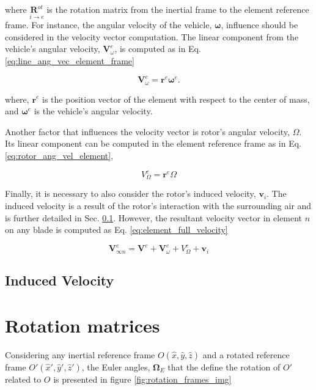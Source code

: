 \noindent where $\underset{i \to e}{\boldsymbol{R}^{ot}}$ is the rotation matrix from the inertial frame to the element reference frame. For instance, the angular velocity of the vehicle, $\boldsymbol{\omega}$, influence should be considered in the velocity vector computation. The linear component from the vehicle’s angular velocity, $\mathbf{V}^e_\omega$, is computed as in Eq. \ref{eq:line_ang_vec_element_frame}

\begin{equation}
    \mathbf{V}^e_\omega = \mathbf{r}^e  \boldsymbol{\omega}^e.
    \label{eq:line_ang_vec_element_frame}
\end{equation}

\noindent where, $\mathbf{r}^e$ is the position vector of the element with respect to the center of mass, and $\boldsymbol{\omega}^e$ is the vehicle's angular velocity.

Another factor that influences the velocity vector is rotor's angular velocity, $\Omega$. Its linear component can be computed in the element reference frame as in Eq. \ref{eq:rotor_ang_vel_element},

\begin{equation}
    V^e_{\Omega} = \mathbf{r}^e \Omega
    \label{eq:rotor_ang_vel_element}
\end{equation}

Finally, it is necessary to also consider the rotor’s induced velocity, $\mathbf{v}_i$. The induced velocity is a result of the rotor’s interaction with the surrounding air and is further detailed in Sec. \ref{sec:induced_Velocity}. However, the resultant velocity vector in element $n$ on any blade is computed as Eq. \ref{eq:element_full_velocity}

\begin{equation}
    \mathbf{V}_{\infty n}^e = \mathbf{V}^e + \mathbf{V}^e_\omega + V^e_{\Omega} + \mathbf{v}_i
    \label{eq:element_full_velocity}
\end{equation}

\subsection{Induced Velocity}
\label{sec:induced_Velocity}


\section{Rotation matrices}
\label{sec:rotation_matrices}

Considering any inertial reference frame $O(\hat{x},\hat{y},\hat{z})$ and a rotated reference frame $O'(\hat{x}',\hat{y}',\hat{z}')$, the Euler angles, $\boldsymbol{\Omega}_E$ that the define the rotation of $O'$ related to $O$ is presented in figure \ref{fig:rotation_frames_img}

